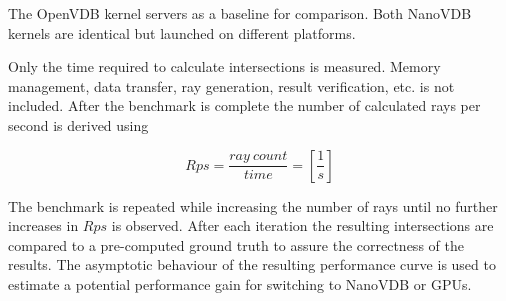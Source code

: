The OpenVDB kernel servers as a baseline for comparison.
Both NanoVDB kernels are identical but launched on different platforms.

Only the time required to calculate intersections is measured. Memory management, data transfer, ray generation, result verification, etc. is not included.
After the benchmark is complete the number of calculated rays per second is derived using

\begin{equation}
	Rps = \frac{ray \: count}{time} = [\frac{1}{s}]
\end{equation}

The benchmark is repeated while increasing the number of rays until no further increases in $Rps$ is observed.
After each iteration the resulting intersections are compared to a pre-computed ground truth to assure the correctness of the results.
The asymptotic behaviour of the resulting performance curve is used to estimate a potential performance gain for switching to NanoVDB or GPUs.